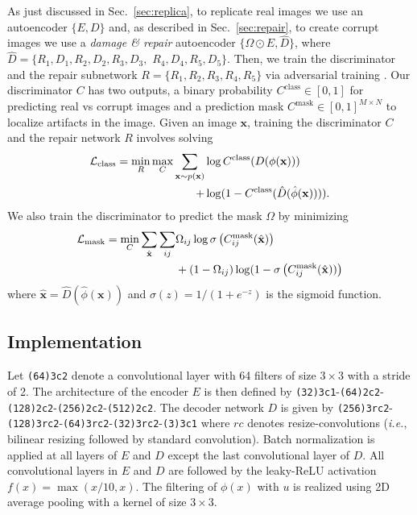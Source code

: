 \documentclass[10pt,twocolumn,letterpaper]{article}
\begin{document}
As just discussed in Sec.~\ref{sec:replica}, to replicate real images we use an autoencoder $\{E,D\}$ and, as described in Sec.~\ref{sec:repair}, to create corrupt images we use a \emph{damage \& repair} autoencoder $\{\Omega \odot E, \hat D\}$, where $\hat D = \{R_1,D_1,R_2,D_2,R_3,D_3,$ $R_4,D_4,R_5,D_5\}$. Then, we train the discriminator and the repair subnetwork $R = \{R_1,R_2,R_3,R_4,R_5\}$ via adversarial training \cite{goodfellow2014generative}.
Our discriminator $C$ has two outputs, a binary probability $C^\text{class}\in [0,1]$ for predicting real vs corrupt images and a prediction mask $C^\text{mask}\in [0,1]^{M\times N}$ to localize artifacts in the image.
Given an image $\mathbf{x}$, training the discriminator $C$ and the repair network $R$  involves solving 
\begin{equation}
\begin{split}
{\cal L}_\text{class} = \min_R \max_C \sum_{\mathbf{x}\sim p(\mathbf{x})}& \log C^\text{class}(D(\phi(\mathbf{x})))\\
 +& \log (1-C^\text{class}(\hat D(\hat \phi(\mathbf{x})))).
\end{split}
\end{equation}
We also train the discriminator to predict the mask $\Omega$ by minimizing
\begin{align}{\cal L}_\text{mask} = \min_C \sum_{\hat{\mathbf{x}}}\sum_{ij} &\Omega_{ij}\log \sigma\left(C^\text{mask}_{ij}(\hat{\mathbf{x}})\right)\\
& +(1-\Omega_{ij})\log (1-\sigma\left(C^\text{mask}_{ij}(\hat{\mathbf{x}}))\right)\nonumber
\end{align}
where $\hat{\mathbf{x}} = \hat D(\hat \phi(\mathbf{x}))$ and $\sigma(z)= 1/(1+e^{-z})$ is the sigmoid function.


\subsection{Implementation}

Let \texttt{(64)3c2} denote a convolutional layer with 64 filters of size $3\times3$ with a stride of 2. The architecture of the encoder $E$ is then defined by \texttt{(32)3c1}-\texttt{(64)2c2}-\texttt{(128)2c2}-\texttt{(256)2c2}-\texttt{(512)2c2}. The decoder network $D$ is given by \texttt{(256)3rc2}-\texttt{(128)3rc2}-\texttt{(64)3rc2}-\texttt{(32)3rc2}-\texttt{(3)3c1} where $rc$ denotes resize-convolutions (\textit{i.e.}, bilinear resizing followed by standard convolution). 
Batch normalization \cite{ioffe2015batch} is applied at all layers of $E$ and $D$ except the last convolutional layer of $D$. All convolutional layers in $E$ and $D$ are followed by the leaky-ReLU activation $f(x)=\max(x/10, x)$. The filtering of $\phi(x)$ with $u$ is realized using 2D average pooling with a kernel of size $3\times3$.
\end{document}
